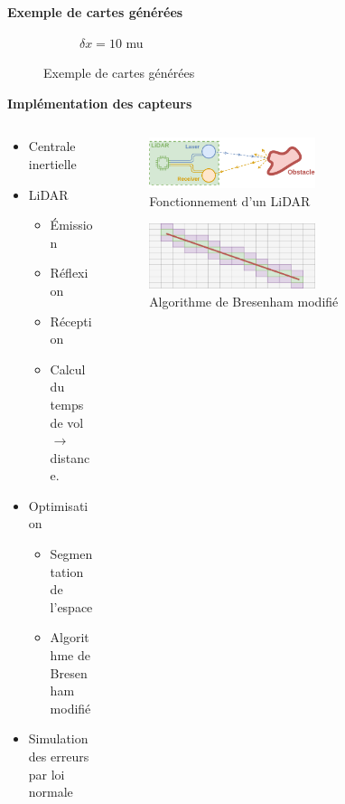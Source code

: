 \documentclass[aspectratio=169,10pt]{beamer}
\begin{document}
\begin{frame}{\textbf{Exemple de cartes générées}}
\begin{figure}[H]
\begin{subfigure}{0.32\textwidth}
			\caption{$\delta x = 10$ mu}
			\label{fig:real_map_10}
		\end{subfigure}
		\caption{Exemple de cartes générées}
		\label{fig:three_map_example}
	\end{figure}
\end{frame}

\begin{frame}{\textbf{Implémentation des capteurs}}
	\begin{columns}
		\begin{column}{0.5\textwidth}
			\begin{itemize}
				\item Centrale inertielle
				\vspace{0.2cm}
				\item LiDAR
				\begin{itemize}
					\item Émission
					\item Réflexion
					\item Réception
					\item Calcul du temps de vol $\rightarrow$ distance.
				\end{itemize}
				\vspace{0.2cm}
				\item Optimisation
				\begin{itemize}
					\item Segmentation de l'espace
					\item Algorithme de Bresenham modifié
				\end{itemize}
				\item Simulation des erreurs par loi normale
			\end{itemize}
		\end{column}
		\begin{column}{0.5\textwidth}
			\begin{figure}
				\centering
				\includegraphics[width=0.6\textwidth]{IMAGES/lidar_operation_scheme.png}
				\caption{Fonctionnement d'un LiDAR}
				\label{fig:lidar_ope}
			\end{figure}
			\begin{figure}
				\centering
				\includegraphics[width=0.6\textwidth]{IMAGES/draw_line.png}
				\caption{Algorithme de Bresenham modifié}
				\label{fig:bresenham_algorithm}
			\end{figure}
			

\end{column}
\end{columns}
\end{frame}
\end{document}
